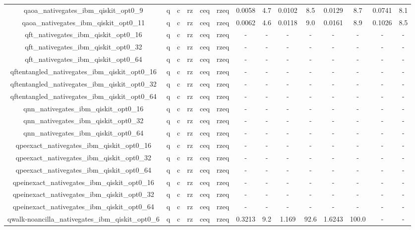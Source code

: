 \begin{table}[htb]
{\begin{tabular}{|c|c|c|c|c|c|c|c|c|c|c|c|c|c|}
qaoa_nativegates_ibm_qiskit_opt0_9 & q & c & rz & ceq & rzeq & 0.0058 & 4.7 & 0.0102 & 8.5 & 0.0129 & 8.7 & 0.0741 & 8.1 \\ 
qaoa_nativegates_ibm_qiskit_opt0_11 & q & c & rz & ceq & rzeq & 0.0062 & 4.6 & 0.0118 & 9.0 & 0.0161 & 8.9 & 0.1026 & 8.5 \\ 
qft_nativegates_ibm_qiskit_opt0_16 & q & c & rz & ceq & rzeq & - & - & - & - & - & - & - & - \\ 
qft_nativegates_ibm_qiskit_opt0_32 & q & c & rz & ceq & rzeq & - & - & - & - & - & - & - & - \\ 
qft_nativegates_ibm_qiskit_opt0_64 & q & c & rz & ceq & rzeq & - & - & - & - & - & - & - & - \\ 
qftentangled_nativegates_ibm_qiskit_opt0_16 & q & c & rz & ceq & rzeq & - & - & - & - & - & - & - & - \\ 
qftentangled_nativegates_ibm_qiskit_opt0_32 & q & c & rz & ceq & rzeq & - & - & - & - & - & - & - & - \\ 
qftentangled_nativegates_ibm_qiskit_opt0_64 & q & c & rz & ceq & rzeq & - & - & - & - & - & - & - & - \\ 
qnn_nativegates_ibm_qiskit_opt0_16 & q & c & rz & ceq & rzeq & - & - & - & - & - & - & - & - \\ 
qnn_nativegates_ibm_qiskit_opt0_32 & q & c & rz & ceq & rzeq & - & - & - & - & - & - & - & - \\ 
qnn_nativegates_ibm_qiskit_opt0_64 & q & c & rz & ceq & rzeq & - & - & - & - & - & - & - & - \\ 
qpeexact_nativegates_ibm_qiskit_opt0_16 & q & c & rz & ceq & rzeq & - & - & - & - & - & - & - & - \\ 
qpeexact_nativegates_ibm_qiskit_opt0_32 & q & c & rz & ceq & rzeq & - & - & - & - & - & - & - & - \\ 
qpeexact_nativegates_ibm_qiskit_opt0_64 & q & c & rz & ceq & rzeq & - & - & - & - & - & - & - & - \\ 
qpeinexact_nativegates_ibm_qiskit_opt0_16 & q & c & rz & ceq & rzeq & - & - & - & - & - & - & - & - \\ 
qpeinexact_nativegates_ibm_qiskit_opt0_32 & q & c & rz & ceq & rzeq & - & - & - & - & - & - & - & - \\ 
qpeinexact_nativegates_ibm_qiskit_opt0_64 & q & c & rz & ceq & rzeq & - & - & - & - & - & - & - & - \\ 
qwalk-noancilla_nativegates_ibm_qiskit_opt0_6 & q & c & rz & ceq & rzeq & 0.3213 & 9.2 & 1.169 & 92.6 & 1.6243 & 100.0 & - & - \\ 

\end{tabular}}
\end{table}
